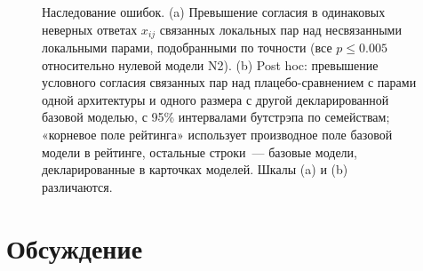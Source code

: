 \documentclass[preprint,12pt,authoryear]{elsarticle}
\begin{document}
\begin{figure}[!htbp]
\begin{tikzpicture}
\end{tikzpicture}
\caption{Наследование ошибок. (a) Превышение согласия в одинаковых неверных ответах $x_{ij}$ связанных локальных пар над несвязанными локальными парами, подобранными по точности (все $p\le0.005$ относительно нулевой модели N2). (b) Post hoc: превышение условного согласия связанных пар над плацебо-сравнением с парами одной архитектуры и одного размера с другой декларированной базовой моделью, с 95\% интервалами бутстрэпа по семействам; «корневое поле рейтинга» использует производное поле базовой модели в рейтинге, остальные строки~--- базовые модели, декларированные в карточках моделей. Шкалы (a) и (b) различаются.}
\label{fig:inherit}
\end{figure}

\section{Обсуждение}
\end{document}
